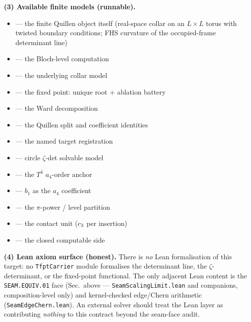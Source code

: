 \par\smallskip\noindent\textbf{(3) Available finite models (runnable).}
\begin{itemize}
\item {} --- the finite Quillen object itself (real-space
  collar on an $L\times L$ torus with twisted boundary conditions; FHS curvature of the
  occupied-frame determinant line)
\item {} --- the Bloch-level computation
\item {} --- the underlying collar model
\item {} --- the fixed point: unique root $+$ ablation battery
\item {} --- the Ward decomposition
\item {} --- the Quillen split and coefficient identities
\item {} --- the named target registration
\item {} --- circle $\zeta$-det solvable model
\item {} --- the $T^4$ $a_4$-order anchor
\item {} --- $b_1$ as the $a_4$ coefficient
\item {} --- the $\pi$-power / level partition
\item {} --- the contact unit ($c_3$ per insertion)
\item {} --- the closed computable side
\end{itemize}

\par\smallskip\noindent\textbf{(4) Lean axiom surface (honest).} There is \emph{no} Lean
formalisation of this target: no \texttt{TfptCarrier} module formalises the determinant line,
the $\zeta$-determinant, or the fixed-point functional. The only adjacent Lean content is the
\texttt{SEAM.EQUIV.01} face (Sec.\ above --- \texttt{SeamScalingLimit.lean} and companions,
composition-level only) and kernel-checked edge/Chern arithmetic
(\texttt{SeamEdgeChern.lean}). An external solver should treat the Lean layer as contributing
\emph{nothing} to this contract beyond the seam-face audit.

